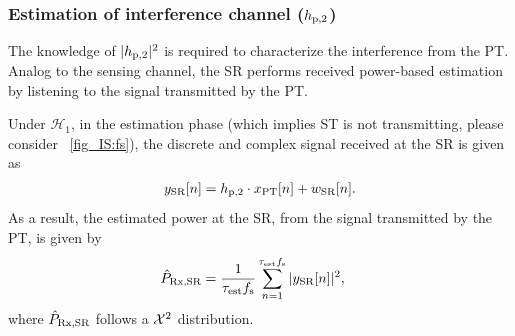 \subsubsection{Estimation of interference channel ($h_{\text{p,2}}$)}
The knowledge of $|h_{\text{p,2}}|^2$ is required to characterize the interference from the PT. 
Analog to the sensing channel, the SR performs received power-based estimation by listening to the signal transmitted by the PT. 

Under $\mathcal H_1$, in the estimation phase (which implies ST is not transmitting, please consider \figurename~\ref{fig_IS:fs}), the discrete and complex signal received at the SR is given as 
\begin{align}
y_{\text{SR}}[n] = h_{\text{p,2}} \cdot x_{\text{PT}}[n] + w_{\text{SR}}[n].
\label{eq_IS:sys_mod_p2s}
\end{align}
As a result, the estimated power at the SR, from the signal transmitted by the PT, is given by  
\begin{align} 
\hat{P}_{\text{Rx,SR}} &= \frac{1}{\tau_{\text{est}} f_{\text{s}}} \sum\limits_{n = 1}^{\tau_{\text{est}} f_{\text{s}}} |y_{\text{SR}}[n]|^2,
\label{eq_IS:ehp2}
\end{align}
where $\hat{P}_{\text{Rx,SR}}$ follows a $\cchi2$ distribution.%
 
